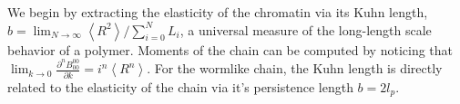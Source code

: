 \documentclass[%
 reprint,
superscriptaddress,
showpacs,preprintnumbers,
 amsmath,amssymb,
 aps,
 prl,
]{revtex4-1}
\newcommand{\RR}{\left\langle{}R^2\right\rangle{}}
\begin{document}

%


We begin by extracting the elasticity of the chromatin via its Kuhn length,
$b = \lim_{N\to\infty} \RR/\sum_{i=0}^N L_i$, a universal measure of the long-length scale behavior of a polymer.
Moments of the chain can be computed by noticing that
    $\lim_{k\to0} \frac{\partial^n B_{00}^{00}}{\partial k} = i^n \left\langle
    R^n\right\rangle$.
For the wormlike chain, the Kuhn length is directly related to the elasticity of
    the chain via it's persistence length $b = 2l_p$.
\end{document}
